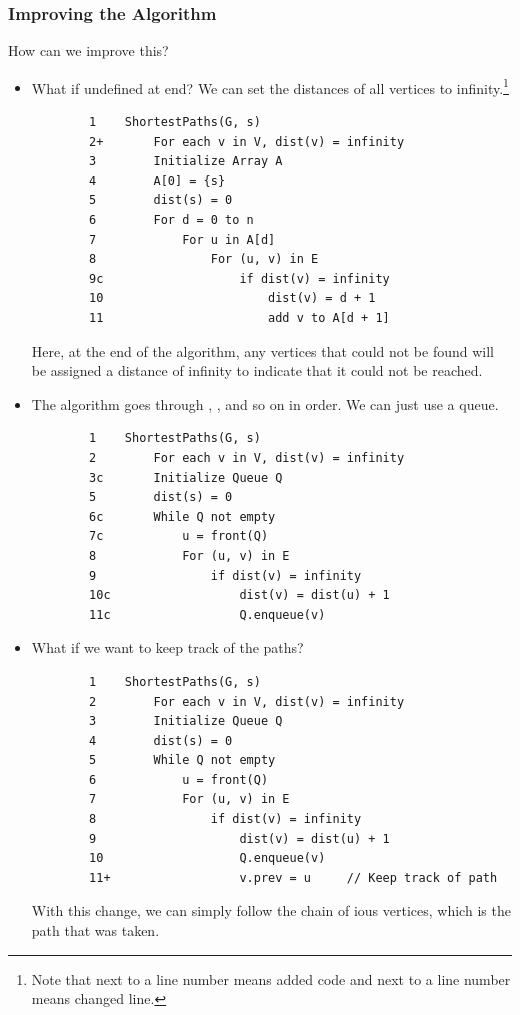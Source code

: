 \documentclass[letterpaper]{article}
\begin{document}
\subsubsection{Improving the Algorithm}
How can we improve this?
\begin{itemize}
    \item What if  undefined at end? We can set the distances of all vertices to infinity.\footnote{Note that \code{+} next to a line number means added code and  next to a line number means changed line.}
    \begin{verbatim}
        1    ShortestPaths(G, s)
        2+       For each v in V, dist(v) = infinity 
        3        Initialize Array A
        4        A[0] = {s}
        5        dist(s) = 0
        6        For d = 0 to n
        7            For u in A[d]
        8                For (u, v) in E
        9c                   if dist(v) = infinity
        10                       dist(v) = d + 1
        11                       add v to A[d + 1]
    \end{verbatim}
    Here, at the end of the algorithm, any vertices that could not be found will be assigned a distance of infinity to indicate that it could not be reached. 

    \item The algorithm goes through , , and so on in order. We can just use a queue.
    \begin{verbatim}
        1    ShortestPaths(G, s)
        2        For each v in V, dist(v) = infinity 
        3c       Initialize Queue Q
        5        dist(s) = 0
        6c       While Q not empty
        7c           u = front(Q)
        8            For (u, v) in E
        9                if dist(v) = infinity
        10c                  dist(v) = dist(u) + 1
        11c                  Q.enqueue(v)
    \end{verbatim}

    \item What if we want to keep track of the paths? 
    \begin{verbatim}
        1    ShortestPaths(G, s)
        2        For each v in V, dist(v) = infinity 
        3        Initialize Queue Q
        4        dist(s) = 0
        5        While Q not empty
        6            u = front(Q)
        7            For (u, v) in E
        8                if dist(v) = infinity
        9                    dist(v) = dist(u) + 1
        10                   Q.enqueue(v)
        11+                  v.prev = u     // Keep track of path
    \end{verbatim}
    With this change, we can simply follow the chain of ious vertices, which is the path that was taken. 
\end{itemize}
\end{document}
